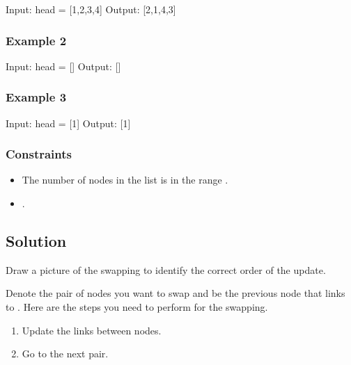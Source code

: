 \documentclass[letterpaper,12pt,english]{book}
\begin{document}
\begin{sphinxVerbatim}[commandchars=\\\{\}]
Input: head = [1,2,3,4]
Output: [2,1,4,3]
\end{sphinxVerbatim}


\subsubsection{Example 2}
\label{\detokenize{Linked_List/02_LL_24_Swap_Nodes_in_Pairs:example-2}}
\begin{sphinxVerbatim}[commandchars=\\\{\}]
Input: head = []
Output: []
\end{sphinxVerbatim}


\subsubsection{Example 3}
\label{\detokenize{Linked_List/02_LL_24_Swap_Nodes_in_Pairs:example-3}}
\begin{sphinxVerbatim}[commandchars=\\\{\}]
Input: head = [1]
Output: [1]
\end{sphinxVerbatim}


\subsubsection{Constraints}
\label{\detokenize{Linked_List/02_LL_24_Swap_Nodes_in_Pairs:constraints}}\begin{itemize}
\item {} 
\sphinxAtStartPar
The number of nodes in the list is in the range \sphinxcode{\sphinxupquote{{[}0, 100{]}}}.

\item {} 
\sphinxAtStartPar
{}.

\end{itemize}


\subsection{Solution}
\label{\detokenize{Linked_List/02_LL_24_Swap_Nodes_in_Pairs:solution}}
\sphinxAtStartPar
Draw a picture of the swapping to identify the correct order of the update.

\sphinxAtStartPar
{}

\sphinxAtStartPar
Denote  the pair of nodes you want to swap and  be the previous node that links to . Here are the steps you need to perform for the swapping.
\begin{enumerate}
%
\item {} 
\sphinxAtStartPar
Update the links between nodes.

\item {} 
\sphinxAtStartPar
Go to the next pair.

\end{enumerate}
\end{document}
